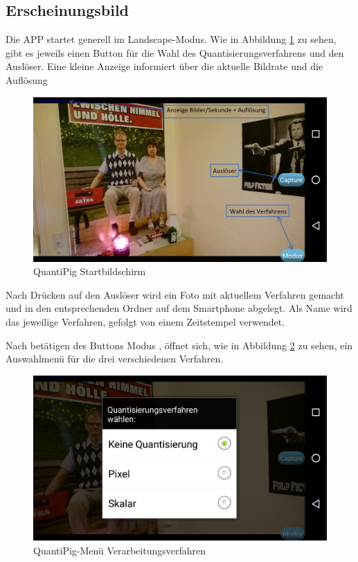 \begin{description}
\subsection{Erscheinungsbild}
Die APP startet generell im Landscape-Modus. Wie in Abbildung \ref{fig:pig_menue} zu sehen, gibt es jeweils einen Button für die Wahl des Quantisierungsverfahrens und den Auslöser. Eine kleine Anzeige informiert über die aktuelle Bildrate und die Auflösung

\begin{figure}[h]
	\centering
		\includegraphics[width=1.0\textwidth]{img/Startbildschirm_QuantiPig.png}
	\caption[QuantiPig Startbildschirm]{QuantiPig Startbildschirm}
	\label{fig:pig_menue}
\end{figure}

Nach Drücken auf den Auslöser wird ein Foto mit aktuellem Verfahren gemacht und in den entsprechenden Ordner auf dem Smartphone abgelegt. Als Name wird das jeweilige Verfahren, gefolgt von einem Zeitstempel verwendet.

Nach betätigen des Buttons \glqq
Modus\grqq
, öffnet sich, wie in Abbildung \ref{fig:pig_verfahren} zu sehen, ein Auswahlmenü für die drei verschiedenen Verfahren.

\begin{figure}[h!]
	\centering
		\includegraphics[width=1.0\textwidth]{img/Verfahren_QuantiPig.png}
	\caption[QuantiPig-Menü Verarbeitungsverfahren]{QuantiPig-Menü Verarbeitungsverfahren}
	\label{fig:pig_verfahren}
\end{figure}


\end{description}
